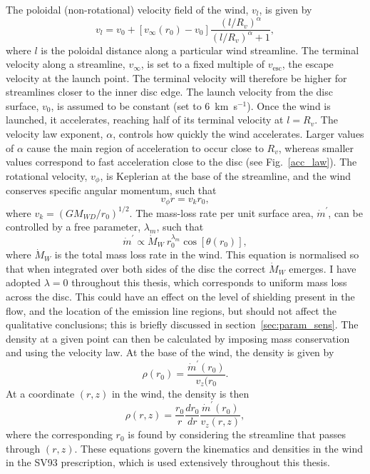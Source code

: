 The poloidal (non-rotational) velocity field of the wind, $v_l$, is given by
\begin{equation}
v_l=v_0+\left[v_{\infty}(r_0)-v_0\right]\frac{\left(l/R_v\right)^{\alpha}}{\left(l/R_v\right)^{\alpha}+1},
\label{eq:v_law}
\end{equation}
where $l$ is the poloidal distance along a particular wind
streamline. The terminal velocity along a streamline, $v_{\infty}$, is
set to a fixed multiple of $v_{\mathrm{esc}}$, the escape velocity at the launch
point. The terminal velocity will therefore be higher for streamlines closer
to the inner disc edge.
The launch velocity from the disc surface, $v_0$, is assumed to
be constant (set to $6$~km~s$^{-1}$). Once the wind is launched, it
accelerates, reaching half of its terminal velocity at $l = R_v$. The
velocity law exponent, $\alpha$, controls how quickly the wind
accelerates. Larger values of $\alpha$ cause the main region of 
acceleration to occur close to $R_v$, whereas smaller values
correspond to fast acceleration close to the disc (see
Fig.~\ref{acc_law}). The rotational velocity, $v_\phi$, is 
Keplerian at the base of the streamline, 
and the wind conserves specific angular momentum, such that
\begin{equation}
v_\phi r = v_{k} r_0,
\label{eq:vrot}
\end{equation}
where $v_{k}=(GM_{WD}/r_0)^{1/2}$.
The mass-loss rate per unit surface area, $\dot{m}^\prime$,
can be controlled by a free parameter, $\lambda_m$, such that
\begin{equation}
\dot{m}^\prime \propto \dot{M}_W~r_0^{\lambda_m} \cos [\theta(r_0)],
\label{eq:dmda}
\end{equation}
where $\dot{M}_W$ is the total mass loss rate in the wind. This equation is normalised so 
that when integrated over both sides of the disc the correct $\dot{M}_W$ emerges.
I have adopted $\lambda=0$ throughout this thesis, which corresponds to uniform
mass loss across the disc. This could have an effect on the level of shielding present 
in the flow, and the location of the emission line regions, but should not affect the qualitative
conclusions; this is briefly discussed in section~\ref{sec:param_sens}.
The density at a given point can then be calculated by imposing mass conservation
and using the velocity law. At the base of the wind, the density is 
given by
\begin{equation}
\rho (r_0) = \frac{\dot{m}^\prime(r_0)}{v_z(r_0}.
\label{eq:rho0}
\end{equation}
At a coordinate $(r,z)$ in the wind, the density is then
\begin{equation}
\rho (r, z) = \frac{r_0}{r} \frac{d r_0}{dr}\frac{\dot{m}^\prime(r_0)}{v_z(r,z)},
\label{eq:rho_rz}
\end{equation}
where the corresponding $r_0$ is found by considering the streamline that 
passes through $(r,z)$. These equations govern the kinematics
and densities in the wind in the SV93 prescription, which is used
extensively throughout this thesis. 


